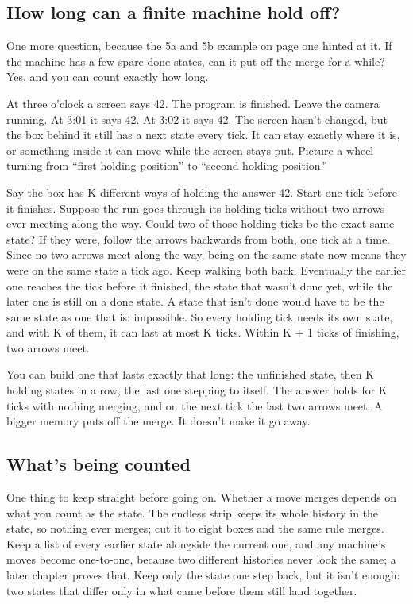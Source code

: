 \documentclass[11pt,twoside]{article}
\theoremstyle{thielethm}
\theoremstyle{thieledef}
\theoremstyle{thieledef}
\theoremstyle{thieledef}
\theoremstyle{thielethm}
\theoremstyle{thieleobs}
\theoremstyle{thielethm}
\begin{document}
\subsection{How long can a finite machine hold off?}

One more question, because the 5a and 5b example on page one hinted at it. If the machine has a few spare done states, can it put off the merge for a while? Yes, and you can count exactly how long.

At three o'clock a screen says 42. The program is finished. Leave the camera running. At 3:01 it says 42. At 3:02 it says 42. The screen hasn't changed, but the box behind it still has a next state every tick. It can stay exactly where it is, or something inside it can move while the screen stays put. Picture a wheel turning from ``first holding position'' to ``second holding position.''

Say the box has K different ways of holding the answer 42. Start one tick before it finishes. Suppose the run goes through its holding ticks without two arrows ever meeting along the way. Could two of those holding ticks be the exact same state? If they were, follow the arrows backwards from both, one tick at a time. Since no two arrows meet along the way, being on the same state now means they were on the same state a tick ago. Keep walking both back. Eventually the earlier one reaches the tick before it finished, the state that wasn't done yet, while the later one is still on a done state. A state that isn't done would have to be the same state as one that is: impossible. So every holding tick needs its own state, and with K of them, it can last at most K ticks. Within K + 1 ticks of finishing, two arrows meet.

You can build one that lasts exactly that long: the unfinished state, then K holding states in a row, the last one stepping to itself. The answer holds for K ticks with nothing merging, and on the next tick the last two arrows meet. A bigger memory puts off the merge. It doesn't make it go away.

\subsection{What's being counted}

One thing to keep straight before going on. Whether a move merges depends on what you count as the state. The endless strip keeps its whole history in the state, so nothing ever merges; cut it to eight boxes and the same rule merges. Keep a list of every earlier state alongside the current one, and any machine's moves become one-to-one, because two different histories never look the same; a later chapter proves that. Keep only the state one step back, but it isn't enough: two states that differ only in what came before them still land together.
\end{document}
